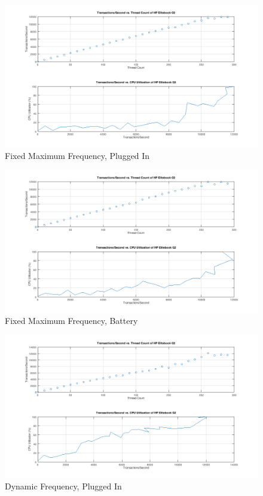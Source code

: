 \documentclass[prb,preprint]{revtex4-1}
\begin{document}
\begin{figure}
		\centering
		\includegraphics[width=10in]{FixedMaxPluggedIn.png}
		\caption{Fixed Maximum Frequency, Plugged In}
		\label{fig1}
\end{figure}

\begin{figure}
\centering
\includegraphics[width=10in]{FixedMaxBattery.png}
\caption{Fixed Maximum Frequency, Battery}
\label{fig1}
\end{figure}

\begin{figure}
\centering
\includegraphics[width=10in]{DynamicPluggedIn.png}
\caption{Dynamic Frequency, Plugged In}
\label{fig1}
\end{figure}
\end{document}
